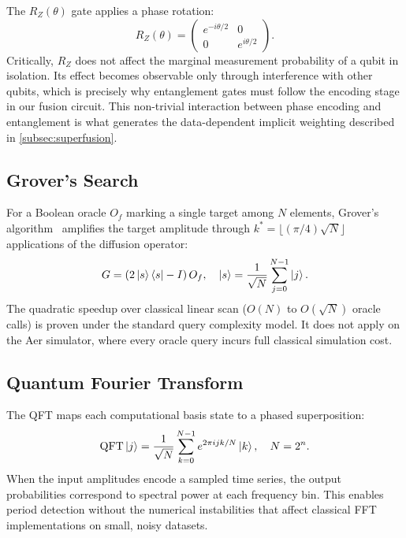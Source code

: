 \documentclass[conference]{IEEEtran}
\begin{document}
The $R_Z(\theta)$ gate applies a phase rotation:
\begin{equation}\label{eq:rz}
R_Z(\theta) = \begin{pmatrix} e^{-i\theta/2} & 0 \\ 0 & e^{i\theta/2} \end{pmatrix}.
\end{equation}
Critically, $R_Z$ does not affect the marginal measurement probability
of a qubit in isolation.
Its effect becomes observable only through interference with other qubits,
which is precisely why entanglement gates must follow the encoding stage
in our fusion circuit.
This non-trivial interaction between phase encoding and entanglement is what
generates the data-dependent implicit weighting described in
\cref{subsec:superfusion}.

\subsection{Grover's Search}\label{subsec:grover_bg}

For a Boolean oracle $O_f$ marking a single target among $N$ elements,
Grover's algorithm~\cite{grover1996fast} amplifies the target amplitude
through $k^* = \lfloor (\pi/4)\sqrt{N} \rfloor$ applications of the
diffusion operator:
\begin{equation}\label{eq:grover}
G = (2\ket{s}\bra{s} - I)\, O_f, \quad
\ket{s} = \frac{1}{\sqrt{N}}\sum_{j=0}^{N-1}\ket{j}.
\end{equation}
The quadratic speedup over classical linear scan ($O(N)$ to $O(\sqrt{N})$
oracle calls) is proven under the standard query complexity model.
It does not apply on the Aer simulator, where every oracle query incurs
full classical simulation cost.

\subsection{Quantum Fourier Transform}

The QFT maps each computational basis state to a phased superposition:
\begin{equation}\label{eq:qft}
\mathrm{QFT}\ket{j} = \frac{1}{\sqrt{N}} \sum_{k=0}^{N-1}
e^{2\pi i jk/N}\ket{k}, \quad N = 2^n.
\end{equation}
When the input amplitudes encode a sampled time series, the output
probabilities correspond to spectral power at each frequency bin.
This enables period detection without the numerical instabilities that
affect classical FFT implementations on small, noisy datasets.
\end{document}
